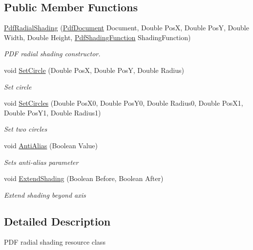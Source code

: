 \subsection*{Public Member Functions}
\begin{DoxyCompactItemize}
\item 
\hyperlink{class_pdf_file_writer_1_1_pdf_radial_shading_aac2f135da0b5bfa86087f67fbf6523a4}{Pdf\+Radial\+Shading} (\hyperlink{class_pdf_file_writer_1_1_pdf_document}{Pdf\+Document} Document, Double PosX, Double PosY, Double Width, Double Height, \hyperlink{class_pdf_file_writer_1_1_pdf_shading_function}{Pdf\+Shading\+Function} Shading\+Function)
\begin{DoxyCompactList}\small\item\em P\+DF radial shading constructor. \end{DoxyCompactList}\item 
void \hyperlink{class_pdf_file_writer_1_1_pdf_radial_shading_ab55fcc7ccaae14a5d11992791649d7a6}{Set\+Circle} (Double PosX, Double PosY, Double Radius)
\begin{DoxyCompactList}\small\item\em Set circle \end{DoxyCompactList}\item 
void \hyperlink{class_pdf_file_writer_1_1_pdf_radial_shading_a6880dbb9fcc3b26d9dd7d0faf411d68b}{Set\+Circles} (Double Pos\+X0, Double Pos\+Y0, Double Radius0, Double Pos\+X1, Double Pos\+Y1, Double Radius1)
\begin{DoxyCompactList}\small\item\em Set two circles \end{DoxyCompactList}\item 
void \hyperlink{class_pdf_file_writer_1_1_pdf_radial_shading_af2010d3e956d7c40a25f35a6762b02f8}{Anti\+Alias} (Boolean Value)
\begin{DoxyCompactList}\small\item\em Sets anti-\/alias parameter \end{DoxyCompactList}\item 
void \hyperlink{class_pdf_file_writer_1_1_pdf_radial_shading_a0b2c638c3412571f414aa01b2dbb6fbb}{Extend\+Shading} (Boolean Before, Boolean After)
\begin{DoxyCompactList}\small\item\em Extend shading beyond axis \end{DoxyCompactList}\end{DoxyCompactItemize}


\subsection{Detailed Description}
P\+DF radial shading resource class 

